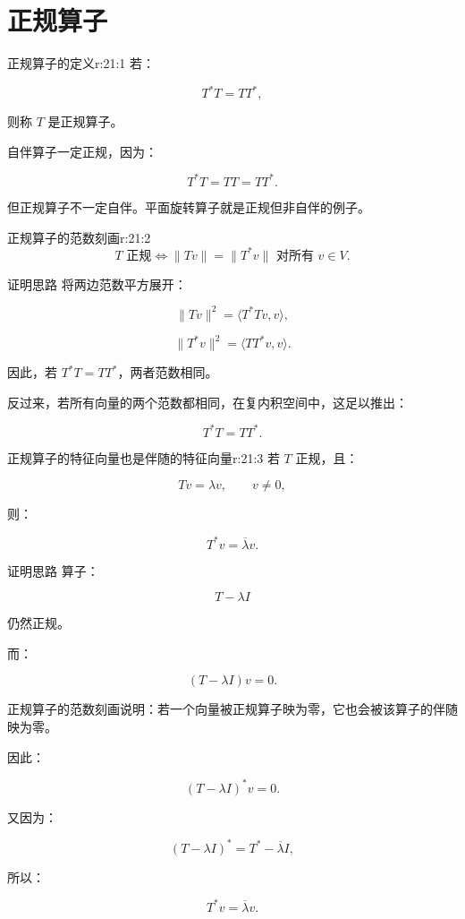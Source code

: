 
\chapter{正规算子}


\begin{jdefn}{正规算子的定义}{r:21:1}
若：

\[
T^*T=TT^*,
\]

则称 $T$ 是正规算子。

自伴算子一定正规，因为：

\[
T^*T=TT=TT^*.
\]

但正规算子不一定自伴。平面旋转算子就是正规但非自伴的例子。
\end{jdefn}

\begin{jprop}{正规算子的范数刻画}{r:21:2}
\[
T\text{ 正规}
\iff
\|Tv\|=\|T^*v\|
\text{ 对所有 }v\in V.
\]
\end{jprop}

\begin{jproof}{证明思路}
将两边范数平方展开：

\[
\|Tv\|^2
=
\langle T^*Tv,v\rangle,
\]

\[
\|T^*v\|^2
=
\langle TT^*v,v\rangle.
\]

因此，若 $T^*T=TT^*$，两者范数相同。

反过来，若所有向量的两个范数都相同，在复内积空间中，这足以推出：

\[
T^*T=TT^*.
\]
\end{jproof}

\begin{jprop}{正规算子的特征向量也是伴随的特征向量}{r:21:3}
若 $T$ 正规，且：

\[
Tv=\lambda v,
\qquad
v\ne0,
\]

则：

\[
T^*v=\overline{\lambda}v.
\]
\end{jprop}

\begin{jproof}{证明思路}
算子：

\[
T-\lambda I
\]

仍然正规。

而：

\[
(T-\lambda I)v=0.
\]

正规算子的范数刻画说明：若一个向量被正规算子映为零，它也会被该算子的伴随映为零。

因此：

\[
(T-\lambda I)^*v=0.
\]

又因为：

\[
(T-\lambda I)^*
=
T^*-\overline{\lambda}I,
\]

所以：

\[
T^*v=\overline{\lambda}v.
\]
\end{jproof}

